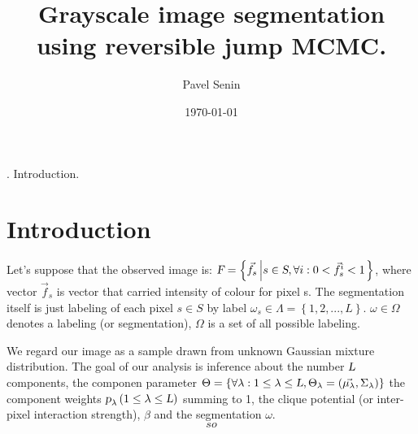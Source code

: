 \documentclass{article}
\title{Grayscale image segmentation using reversible jump MCMC.}
\author{Pavel Senin}
\date{\today}
\begin{document}
\maketitle
\clearpage
{}. Introduction.
\clearpage

\section{Introduction}

Let's suppose that the observed image is:
$\textsl{F} = \left\{ \vec{f}_{s} \left| s \in \textsl{S}, \forall i : 0 < \vec{f}^{i}_{s} < 1 \right. \right\}$,
where vector $\vec{f}_{s}$ is vector that carried intensity of colour for pixel s. The segmentation itself is just labeling of each pixel $s \in S$ by label $\omega_{s} \in \Lambda = \left\{ 1,2,...,L \right\}$. $\omega\in\Omega$ denotes a labeling (or segmentation), $\Omega$ is a set of all possible labeling.

We regard our image as a sample drawn from unknown Gaussian mixture distribution. The goal of our analysis is inference about the number 
$\textsl{L}$ 
components, the componen parameter 
$\Theta = \left\{\forall\lambda : 1\leq \lambda \leq \textsl{L}, \Theta_{\lambda}=\left(\vec{\mu_{\lambda}},\Sigma_{\lambda} \right) \right\}$ 
the component weights 
$\textsl p_{\lambda}\left(1\leq\lambda\leq \textsl L \right)$
summing to 1, the clique potential (or inter-pixel interaction strength),
$\beta$ 
and the segmentation $\omega$.
\[
so
\]
\end{document}
